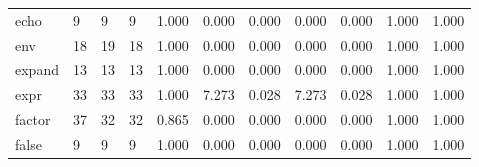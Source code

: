 \begin{longtable}{lp{1.8cm}p{1.8cm}p{1.8cm}p{1.8cm}p{1.8cm}p{1.8cm}p{1.8cm}p{1.8cm}p{1.8cm}p{1.8cm}}
echo      &                            9 &                  9 &                                 9 &                                      1.000 &                                  0.000 &                                        0.000 &                             0.000 &                                   0.000 &                              1.000 &                                              1.000 \\
env       &                           18 &                 19 &                                18 &                                      1.000 &                                  0.000 &                                        0.000 &                             0.000 &                                   0.000 &                              1.000 &                                              1.000 \\
expand    &                           13 &                 13 &                                13 &                                      1.000 &                                  0.000 &                                        0.000 &                             0.000 &                                   0.000 &                              1.000 &                                              1.000 \\
expr      &                           33 &                 33 &                                33 &                                      1.000 &                                  7.273 &                                        0.028 &                             7.273 &                                   0.028 &                              1.000 &                                              1.000 \\
factor    &                           37 &                 32 &                                32 &                                      0.865 &                                  0.000 &                                        0.000 &                             0.000 &                                   0.000 &                              1.000 &                                              1.000 \\
false     &                            9 &                  9 &                                 9 &                                      1.000 &                                  0.000 &                                        0.000 &                             0.000 &                                   0.000 &                              1.000 &                                              1.000 \\

\end{longtable}
